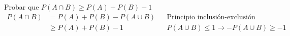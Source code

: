 \item Probar que $P(A\cap B)\geq P(A)+P(B)-1$
    \begin{align*}
        P(A\cap B)&=P(A)+P(B)-P(A\cup B)&&\text{Principio inclusión-exclusión}\\
        &\geq P(A)+P(B)-1&&P(A\cup B)\leq1\to -P(A\cup B)\geq -1
    \end{align*}